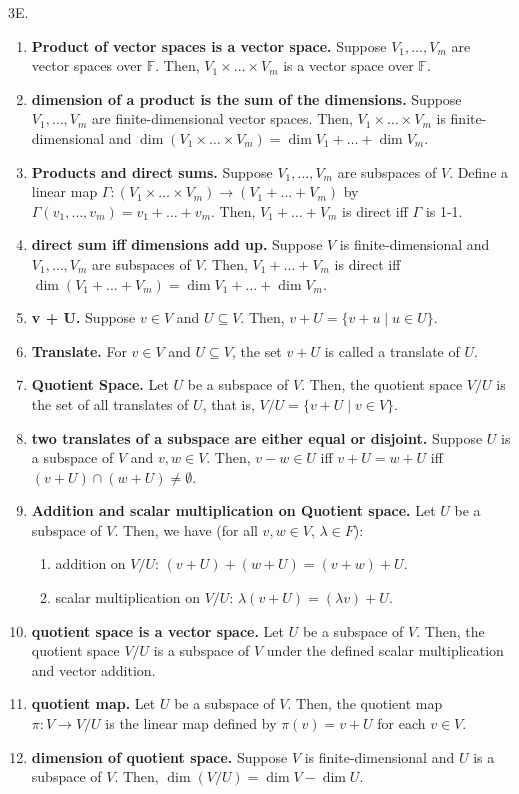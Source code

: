 \documentclass[12pt]{article}
\theoremstyle{definition}
\theoremstyle{named}
\begin{document}
3E. 
\begin{enumerate}
	\item \textbf{Product of vector spaces is a vector space. } Suppose $V_1,\dots,V_m$ are vector spaces over $\mathbb{F}$. Then, $V_1 \times \dots \times V_m$ is a vector space over $\mathbb{F}$. 
	\item \textbf{dimension of a product is the sum of the dimensions. } Suppose $V_1,\dots,V_m$ are finite-dimensional vector spaces. Then, $V_1 \times \dots \times V_m$ is finite-dimensional and $\dim(V_1 \times \dots \times V_m) = \dim V_1 + \dots + \dim V_m$. 
	\item \textbf{Products and direct sums. } Suppose $V_1,\dots,V_m$ are subspaces of $V$. Define a linear map $\Gamma: (V_1 \times \dots \times V_m) \to (V_1 + \dots + V_m)$ by $\Gamma(v_1,\dots,v_m) = v_1 + \dots + v_m$. Then, $V_1 + \dots + V_m$ is direct iff $\Gamma$ is 1-1. 
	\item \textbf{direct sum iff dimensions add up. } Suppose $V$ is finite-dimensional and $V_1,\dots,V_m$ are subspaces of $V$. Then, $V_1 + \dots + V_m$ is direct iff $\dim(V_1 + \dots + V_m) = \dim V_1 + \dots + \dim V_m$. 
	\item \textbf{v + U. } Suppose $v \in V$ and $U \subseteq V$. Then, $v + U = \{v + u \mid u \in U\}$. 
	\item \textbf{Translate. } For $v \in V$ and $U \subseteq V$, the set $v + U$ is called a translate of $U$. 
	\item \textbf{Quotient Space. } Let $U$ be a subspace of $V$. Then, the quotient space $V/U$ is the set of all translates of $U$, that is, $V/U = \{v + U \mid v \in V\}$. 
	\item \textbf{two translates of a subspace are either equal or disjoint. } Suppose $U$ is a subspace of $V$ and $v,w \in V$. Then, $v-w \in U$ iff $v + U = w + U$ iff $(v + U) \cap (w+U) \neq \emptyset$. 
	\item \textbf{Addition and scalar multiplication on Quotient space. } Let $U$ be a subspace of $V$. Then, we have (for all $v,w \in V$, $\lambda \in F$): 
	\begin{enumerate}
		\item addition on $V/U$: $(v + U) + (w + U) = (v+w) + U$. 
		\item scalar multiplication on $V/U$: $\lambda(v + U) = (\lambda v) + U$. 
	\end{enumerate}
	\item \textbf{quotient space is a vector space. } Let $U$ be a subspace of $V$. Then, the quotient space $V/U$ is a subspace of $V$ under the defined scalar multiplication and vector addition. 
	\item \textbf{quotient map. } Let $U$ be a subspace of $V$. Then, the quotient map $\pi: V \to V/U$ is the linear map defined by $\pi(v) = v + U$ for each $v \in V$. 
	\item \textbf{dimension of quotient space. } Suppose $V$ is finite-dimensional and $U$ is a subspace of $V$. Then, $\dim (V/U) = \dim V - \dim U$. 
\end{enumerate}
\end{document}
